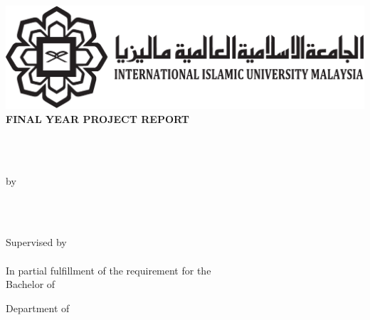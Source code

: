 \documentclass[a4paper]{memoir}
\begin{document}
\thispagestyle{empty}
\begin{LARGE}
\begin{center}
\includegraphics[scale=0.5]{../images/iium}\\[24pt]

{\fontsize{18pt}{20pt}\selectfont
  \textbf{\MakeTextUppercase{Final Year Project Report}\\[48pt]}
}

{\fontsize{16pt}{18pt}\selectfont
  \myTitle\\[48pt]\
}

\vfill

{\fontsize{14pt}{16pt}\selectfont
  by

  \vfill
  \myName\\[10pt]
  \MakeTextUppercase{\myMatric}\\

  \vfill

  Supervised by\\[10pt]
  \mySupervisor\\

  \vfill
  In partial fulfillment of the requirement for the\\
  Bachelor of \myDepartment\\

  \vfill

  Department of \myDepartment\\
  \myKulliyah\\
  \myUni\\

  \vfill

  \vfil
  \myTime\\
  \mySemester\\
}
\end{center}
\end{LARGE}
\end{document}
